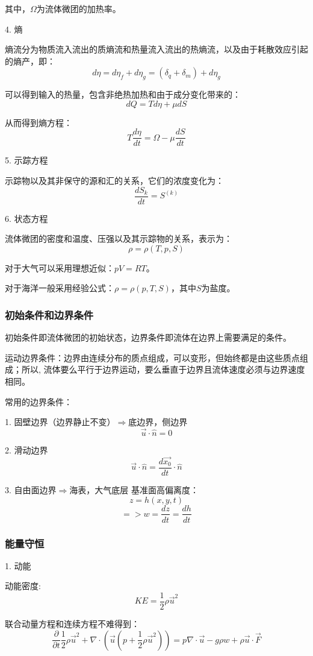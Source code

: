 \documentclass{article}
\begin{document}
其中，$\Omega$为流体微团的加热率。

4. 熵

熵流分为物质流入流出的质熵流和热量流入流出的热熵流，以及由于耗散效应引起的熵产，即：
$$d\eta = d\eta_f + d\eta_g = (\delta_q + \delta_m) + d\eta_g $$

可以得到输入的热量，包含非绝热加热和由于成分变化带来的：
$$dQ = Td\eta + \mu dS$$

从而得到熵方程：
$$T\frac{d\eta}{dt}=\Omega-\mu\frac{dS}{dt}$$

5. 示踪方程

示踪物以及其非保守的源和汇的关系，它们的浓度变化为：
$$\frac{dS_k}{dt} = S^{(k)}$$

6. 状态方程

流体微团的密度和温度、压强以及其示踪物的关系，表示为：
$$\rho = \rho(T,p,S)$$

对于大气可以采用理想近似：$pV=RT$。

对于海洋一般采用经验公式：$\rho = \rho(p,T,S)$，其中$S$为盐度。

\subsubsection{初始条件和边界条件}
初始条件即流体微团的初始状态，边界条件即流体在边界上需要满足的条件。

运动边界条件：边界由连续分布的质点组成，可以变形，但始终都是由这些质点组成；所以, 流体要么平行于边界运动，要么垂直于边界且流体速度必须与边界速度相同。

常用的边界条件：

1. 固壁边界（边界静止不变）$\Rightarrow$底边界，侧边界
$$\vec{u}\cdot\hat{n} = 0$$

2. 滑动边界
$$\vec{u}\cdot\hat{n}=\frac{d\vec{x_0}}{dt}\cdot\hat{n}$$

3. 自由面边界$\Rightarrow$海表，大气底层
基准面高偏离度：
$$z=h(x,y,t)$$
$$=>w=\frac{dz}{dt}=\frac{dh}{dt}$$

\subsubsection{能量守恒}

1. 动能

动能密度:
$$KE=\frac{1}{2}\rho\vec{u}^2$$

联合动量方程和连续方程不难得到：
$$\frac{\partial}{\partial t}\frac{1}{2}\rho\vec{u}^2
+\nabla\cdot\left(\vec{u}(p+\frac{1}{2}\rho\vec{u}^2)\right)
=p\nabla\cdot\vec{u}-g\rho w+\rho\vec{u}\cdot\vec{F}$$
\end{document}
